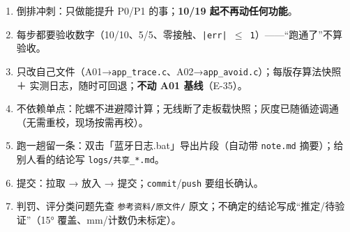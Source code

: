 \documentclass[10.5pt]{article}
\newcommand{\sect}[1]{\par\vspace{9pt}{\large\bfseries\color{accent}#1}\par\vspace{3pt}}
\begin{document}
\sect{7. 协作纪律}
\begin{enumerate}\setlength{\itemsep}{2pt}
\item 倒排冲刺：只做能提升 P0/P1 的事；\textbf{10/19 起不再动任何功能}。
\item 每步都要验收数字（10/10、5/5、零接触、\texttt{|err| $\leq$  1}）——“跑通了”不算验收。
\item 只改自己文件（A01→\texttt{app\_trace.c}、A02→\texttt{app\_avoid.c}）；每版存算法快照 ＋ 实测日志，随时可回退；\textbf{不动 A01 基线}（E-35）。
\item 不依赖单点：陀螺不进避障计算；无线断了走板载快照；灰度已随循迹调通（无需重校，现场按需再校）。
\item 跑一趟留一条：双击「蓝牙日志.bat」导出片段（自动带 \texttt{note.md} 摘要）；给别人看的结论写 \texttt{logs/共享\_*.md}。
\item 提交：拉取 → 放入 → 提交；\texttt{commit}/\texttt{push} 要组长确认。
\item 判罚、评分类问题先查 \texttt{参考资料/原文件/} 原文；不确定的结论写成“推定/待验证”（15° 覆盖、mm/计数仍未标定）。
\end{enumerate}
\end{document}
